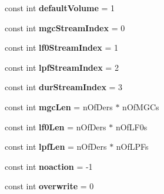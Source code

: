 \begin{DoxyCompactItemize}
\item 
\hypertarget{namespace_m_a_g_e_a05a3181ab06fffff791f99bf9df6dcee}{const int {\bfseries default\-Volume} = 1}\label{namespace_m_a_g_e_a05a3181ab06fffff791f99bf9df6dcee}

\item 
\hypertarget{namespace_m_a_g_e_afe3d6b516bf2ddd0cce309b1b35effc7}{const int {\bfseries mgc\-Stream\-Index} = 0}\label{namespace_m_a_g_e_afe3d6b516bf2ddd0cce309b1b35effc7}

\item 
\hypertarget{namespace_m_a_g_e_ae1590c9e012c9d9c614e0e17b71fead7}{const int {\bfseries lf0\-Stream\-Index} = 1}\label{namespace_m_a_g_e_ae1590c9e012c9d9c614e0e17b71fead7}

\item 
\hypertarget{namespace_m_a_g_e_a862dc97415a1e8ab8959240d0c38567d}{const int {\bfseries lpf\-Stream\-Index} = 2}\label{namespace_m_a_g_e_a862dc97415a1e8ab8959240d0c38567d}

\item 
\hypertarget{namespace_m_a_g_e_a94dc1d2aee01ea03c5616ab896f023d3}{const int {\bfseries dur\-Stream\-Index} = 3}\label{namespace_m_a_g_e_a94dc1d2aee01ea03c5616ab896f023d3}

\item 
\hypertarget{namespace_m_a_g_e_ae448024a2434ab426b6eb2864ca4d6a0}{const int {\bfseries mgc\-Len} = n\-Of\-Ders $\ast$ n\-Of\-M\-G\-Cs}\label{namespace_m_a_g_e_ae448024a2434ab426b6eb2864ca4d6a0}

\item 
\hypertarget{namespace_m_a_g_e_aa93924432bf812ff05dab21f1ffbaf32}{const int {\bfseries lf0\-Len} = n\-Of\-Ders $\ast$ n\-Of\-L\-F0s}\label{namespace_m_a_g_e_aa93924432bf812ff05dab21f1ffbaf32}

\item 
\hypertarget{namespace_m_a_g_e_ac44f5816340536d7c3350dc9ff56e559}{const int {\bfseries lpf\-Len} = n\-Of\-Ders $\ast$ n\-Of\-L\-P\-Fs}\label{namespace_m_a_g_e_ac44f5816340536d7c3350dc9ff56e559}

\item 
\hypertarget{namespace_m_a_g_e_adff3e7a6c9e0bd6c78982e29f946b131}{const int {\bfseries noaction} = -\/1}\label{namespace_m_a_g_e_adff3e7a6c9e0bd6c78982e29f946b131}

\item 
\hypertarget{namespace_m_a_g_e_aff9d55e1160243060a2eff3f3ee0b1d6}{const int {\bfseries overwrite} = 0}\label{namespace_m_a_g_e_aff9d55e1160243060a2eff3f3ee0b1d6}


\end{DoxyCompactItemize}
